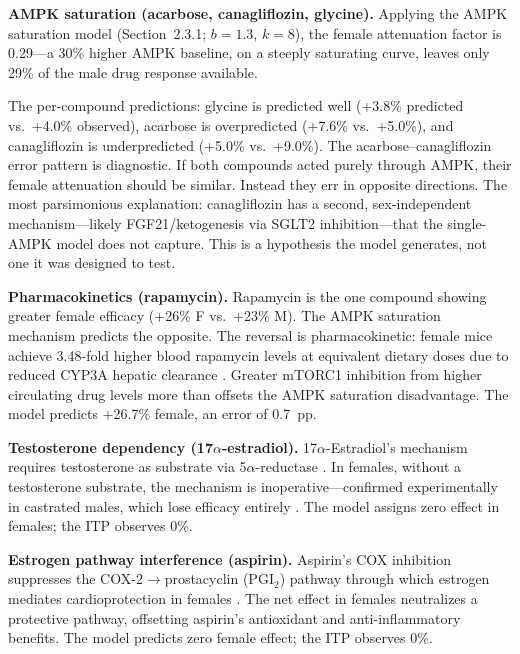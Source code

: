 \documentclass[11pt]{article}
\begin{document}
\textbf{AMPK saturation (acarbose, canagliflozin, glycine).} Applying the AMPK saturation model (Section~2.3.1; $b = 1.3$, $k = 8$), the female attenuation factor is 0.29---a 30\% higher AMPK baseline, on a steeply saturating curve, leaves only 29\% of the male drug response available.

The per-compound predictions: glycine is predicted well (+3.8\% predicted vs.\ +4.0\% observed), acarbose is overpredicted (+7.6\% vs.\ +5.0\%), and canagliflozin is underpredicted (+5.0\% vs.\ +9.0\%). The acarbose--canagliflozin error pattern is diagnostic. If both compounds acted purely through AMPK, their female attenuation should be similar. Instead they err in opposite directions. The most parsimonious explanation: canagliflozin has a second, sex-independent mechanism---likely FGF21/ketogenesis via SGLT2 inhibition---that the single-AMPK model does not capture. This is a hypothesis the model generates, not one it was designed to test.

\textbf{Pharmacokinetics (rapamycin).} Rapamycin is the one compound showing greater female efficacy (+26\% F vs.\ +23\% M). The AMPK saturation mechanism predicts the opposite. The reversal is pharmacokinetic: female mice achieve 3.48-fold higher blood rapamycin levels at equivalent dietary doses due to reduced CYP3A hepatic clearance \citep{Lamming2014}. Greater mTORC1 inhibition from higher circulating drug levels more than offsets the AMPK saturation disadvantage. The model predicts +26.7\% female, an error of 0.7~pp.

\textbf{Testosterone dependency (17$\alpha$-estradiol).} 17$\alpha$-Estradiol's mechanism requires testosterone as substrate via 5$\alpha$-reductase \citep{Garratt2018}. In females, without a testosterone substrate, the mechanism is inoperative---confirmed experimentally in castrated males, which lose efficacy entirely \citep{Garratt2018}. The model assigns zero effect in females; the ITP observes 0\%.

\textbf{Estrogen pathway interference (aspirin).} Aspirin's COX inhibition suppresses the COX-2$\to$prostacyclin (PGI$_2$) pathway through which estrogen mediates cardioprotection in females \citep{Egan2004,Grosser2006}. The net effect in females neutralizes a protective pathway, offsetting aspirin's antioxidant and anti-inflammatory benefits. The model predicts zero female effect; the ITP observes 0\%.

\end{document}
